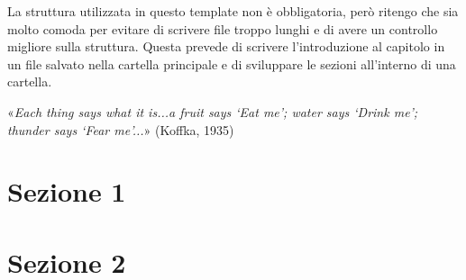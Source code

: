 La struttura utilizzata in questo template non è obbligatoria, però ritengo che sia molto comoda per evitare di scrivere file troppo lunghi e di avere un controllo migliore sulla struttura. Questa prevede di scrivere l'introduzione al capitolo in un file salvato nella cartella principale e di sviluppare le sezioni all'interno di una cartella.

\begin{displayquote}
«\textit{Each thing says what it is...a fruit says ‘Eat me’; water says ‘Drink me’; thunder says ‘Fear me’...}» (Koffka, 1935)
\end{displayquote}

\section{Sezione 1}


\section{Sezione 2}
